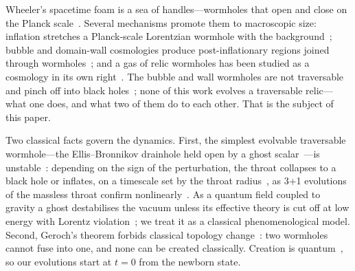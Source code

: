 \documentclass[twocolumn,floatfix,aps,prd,superscriptaddress,nofootinbib]{revtex4-2}
\begin{document}
Wheeler's spacetime foam is a sea of handles---wormholes that open and close on the Planck scale~\cite{wheeler1955,wheeler1957,misner_wheeler1957}. Several mechanisms promote them to macroscopic size: inflation stretches a Planck-scale Lorentzian wormhole with the background~\cite{roman1993}; bubble and domain-wall cosmologies produce post-inflationary regions joined through wormholes~\cite{garriga2016,deng2017,deng_vilenkin2017,gouttenoire2024}; and a gas of relic wormholes has been studied as a cosmology in its own right~\cite{kirillov2008,kirillov2011}. The bubble and wall wormholes are not traversable and pinch off into black holes~\cite{deng2017,deng_vilenkin2017}; none of this work evolves a traversable relic---what one does, and what two of them do to each other. That is the subject of this paper.

Two classical facts govern the dynamics. First, the simplest evolvable traversable wormhole---the Ellis--Bronnikov drainhole held open by a ghost scalar~\cite{ellis1973,bronnikov1973,morris_thorne1988,visser1995}---is unstable~\cite{gonzalez2009lin,bronnikov2011,cremona2019}: depending on the sign of the perturbation, the throat collapses to a black hole or inflates, on a timescale set by the throat radius~\cite{hayward1999,shinkai2002,gonzalez2009,doroshkevich2009,hayward2009,novikov2019}, as 3+1 evolutions of the massless throat confirm nonlinearly~\cite{shirokov2026}. As a quantum field coupled to gravity a ghost destabilises the vacuum unless its effective theory is cut off at low energy with Lorentz violation~\cite{cline2004}; we treat it as a classical phenomenological model. Second, Geroch's theorem forbids classical topology change~\cite{geroch1967,tipler1977}: two wormholes cannot fuse into one, and none can be created classically. Creation is quantum~\cite{hawking1988}, so our evolutions start at $t=0$ from the newborn state.
\end{document}
